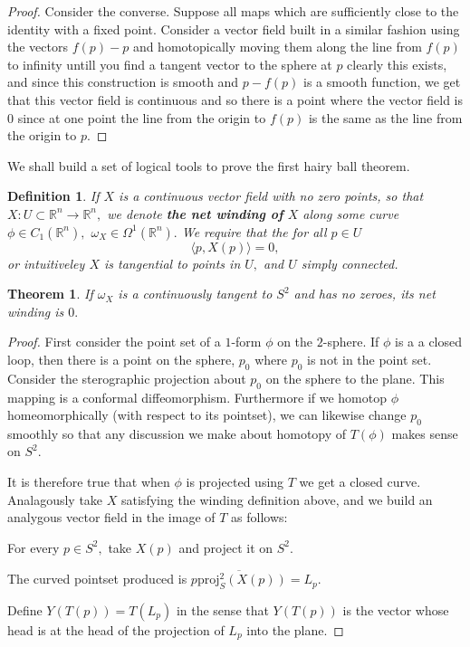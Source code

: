 \documentclass[letter]{article}
\newtheorem{theorem}{Theorem}
\newtheorem{definition}{Definition}
\newenvironment{menumerate}{%
  \edef\backupindent{\the\parindent}%
  \enumerate%
  \setlength{\parindent}{\backupindent}%
}{\endenumerate}
\begin{document}
\begin{menumerate}
\begin{menumerate}
\begin{proof}
    Consider the converse. Suppose all maps which are sufficiently close to the identity with a fixed point. 
    Consider a vector field built in a similar fashion using the vectors $f(p) - p$ and homotopically moving them along the line
    from $f(p)$ to infinity untill you find a tangent vector to the sphere at $p$ clearly this exists, and since this construction is smooth
    and $p-f(p)$ is a smooth function, we get that this vector field is continuous and so there is a point where the vector
    field is $0$ since at one point the line from the origin to $f(p)$ is the same as the line from the origin
    to $p.$
 		\end{proof}
		\item We shall build a set of logical tools to prove the first hairy ball theorem.
		\begin{definition}
			If $X$ is a continuous vector field with no zero points, so that $X: U \subset \mathbb{R}^n \to \mathbb{R}^n,$
			we denote \textbf{the net winding of} $X$ along some curve $\phi \in C_1(\mathbb{R}^n),$
			$\omega_X \in \Omega^1(\mathbb{R}^n).$ We require that the for all  $p \in U$
			\begin{equation}
				\langle p , X(p) \rangle = 0,
			 \end{equation} or intuitiveley $X$ is tangential to points in $U,$ and $U$ \emph{simply connected.} 
		\end{definition}
		\begin{theorem}
			If $\omega_X$ is a continuously tangent to $S^2$ and has no zeroes, its net winding is $0.$
		\end{theorem}
		\begin{proof}
			First consider the point set of a $1$-form $\phi$ on the $2$-sphere. If $\phi$ is a a closed loop,
			then there is a point on the sphere, $p_0$ where $p_0$ is not in the point set. Consider the sterographic projection about 
			$p_0$ on the sphere to the plane. This mapping is a conformal diffeomorphism. Furthermore if we homotop $\phi$ homeomorphically
			(with respect to its pointset), we can likewise change $p_0$ smoothly so that any discussion we make about homotopy
			of $T(\phi)$ makes sense on $S^2.$

			It is therefore true that when $\phi$ is projected using $T$ we get a closed curve. Analagously take $X$ satisfying the winding
			definition above, and we build an analygous vector field in the image of $T$ as follows: 
			\begin{menumerate}
			 	\item For every $p \in S^2,$ take $X(p)$ and project it on $S^2$.
			 	\item The curved pointset produced is $\overline{p \mathrm{proj}_S^2(X(p))} = L_p.$
			 	\item Define $Y(T(p)) = T(L_p)$ in the sense that $Y(T(p))$ is the vector whose head is at the head
			 	of the projection of $L_p$ into the plane. 
			 \end{menumerate} 


\end{proof}
\end{menumerate}
\end{menumerate}
\end{document}
